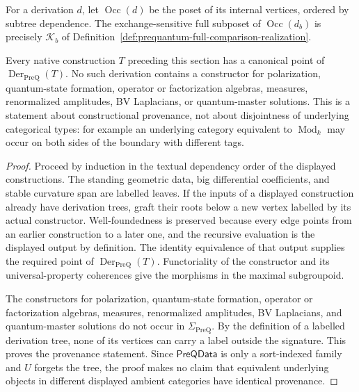 \begin{definition}
For a derivation $d$, let $\operatorname{Occ}(d)$ be the poset of its internal
vertices, ordered by subtree dependence.  The exchange-sensitive full subposet
of $\operatorname{Occ}(d_b)$ is precisely $\mathcal K_b$ of
Definition~\ref{def:prequantum-full-comparison-realization}.
\end{definition}

\begin{proposition}
\label{prop:prequantum-output-type-boundary}
Every native construction $T$ preceding this section has a canonical point of
$\operatorname{Der}_{\mathrm{PreQ}}(T)$.  No such derivation contains a
constructor for
polarization, quantum-state formation, operator or factorization algebras,
measures, renormalized amplitudes, BV Laplacians, or quantum-master solutions.
This is a statement about constructional provenance, not about disjointness of
underlying categorical types: for example an underlying category equivalent to
$\operatorname{Mod}_k$ may occur on both sides of the boundary with different
tags.
\end{proposition}

\begin{proof}
Proceed by induction in the textual dependency order of the displayed
constructions.  The standing geometric data, big differential coefficients, and
stable curvature span are labelled leaves.  If the inputs of a displayed
construction already have derivation trees, graft their roots below a new vertex
labelled by its actual constructor.  Well-foundedness is preserved because every
edge points from an earlier construction to a later one, and the recursive
evaluation is the displayed output by definition.  The identity equivalence of
that output supplies the required point of
$\operatorname{Der}_{\mathrm{PreQ}}(T)$.  Functoriality of the constructor and
its universal-property coherences give the morphisms in the maximal subgroupoid.

The constructors for polarization, quantum-state formation, operator or
factorization algebras, measures, renormalized amplitudes, BV Laplacians, and
quantum-master solutions do not occur in $\Sigma_{\mathrm{PreQ}}$.  By the
definition of a labelled derivation tree, none of its vertices can carry a label
outside the signature.  This proves the provenance statement.  Since
$\mathsf{PreQData}$ is only a sort-indexed family and $U$ forgets the tree, the
proof makes no claim that equivalent underlying objects in different displayed
ambient categories have identical provenance.
\end{proof}

